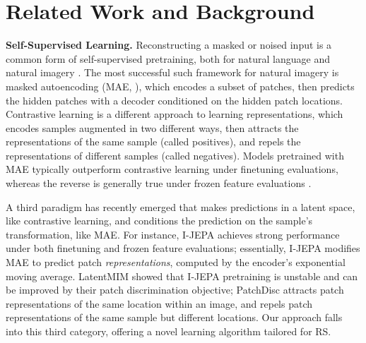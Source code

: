 \section{Related Work and Background}
\textbf{Self-Supervised Learning.} Reconstructing a masked or noised input is a common form of self-supervised pretraining, both for natural language \cite{devlin2018bert, radfordimproving, skipgram} and natural imagery \cite{xie2022simmim, he2022masked, vincent2008extracting}. The most successful such framework for natural imagery is masked autoencoding (MAE, \citet{he2022masked}), which encodes a subset of patches, then predicts the hidden patches with a decoder conditioned on the hidden patch locations. 
%
Contrastive learning \cite{le2020contrastive, oord2018representation, chen2020simple, chopra2005learning} is a different approach to learning representations, which encodes samples augmented in two different ways, then attracts the representations of the same sample (called positives), and repels the representations of different samples (called negatives). 
%
Models pretrained with MAE typically outperform contrastive learning under finetuning evaluations, whereas the reverse is generally true under frozen feature evaluations \cite{park2023what, he2022masked, garrido2024learning}. 

A third paradigm has recently emerged that makes predictions in a latent space, like contrastive learning, and conditions the prediction on the sample's transformation, like MAE. For instance, I-JEPA \cite{assran2023self} achieves strong performance under both finetuning and frozen feature evaluations; essentially, I-JEPA modifies MAE to predict patch \emph{representations}, computed by the encoder's exponential moving average. LatentMIM \cite{wei2024towards} showed that I-JEPA pretraining is unstable and can be improved by their patch discrimination objective; PatchDisc attracts patch representations of the same location within an image, and repels patch representations of the same sample but different locations. Our approach falls into this third category, offering a novel learning algorithm tailored for RS.

